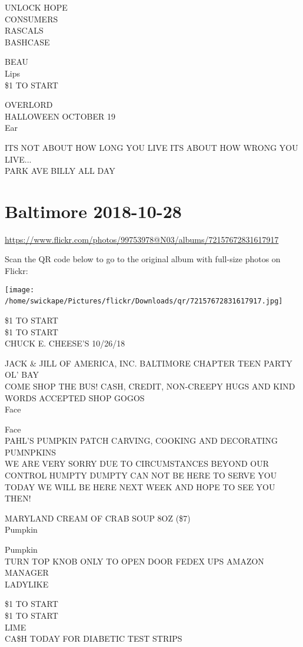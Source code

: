 \documentclass[10pt,letterpaper]{article}
\begin{document}
UNLOCK HOPE\\
CONSUMERS\\
RASCALS\\
BASHCASE

BEAU\\
Lips\\
\$1 TO START

OVERLORD\\
HALLOWEEN OCTOBER 19\\
Ear

ITS NOT ABOUT HOW LONG YOU LIVE ITS ABOUT HOW WRONG YOU LIVE...\\
PARK AVE BILLY ALL DAY
\

\section*{Baltimore 2018-10-28}

\url{https://www.flickr.com/photos/99753978@N03/albums/72157672831617917}

Scan the QR code below to go to the original album with full-size photos on Flickr:

\texttt{[image: /home/swickape/Pictures/flickr/Downloads/qr/72157672831617917.jpg]}
\

\$1 TO START\\
\$1 TO START\\
CHUCK E. CHEESE'S 10/26/18

JACK \& JILL OF AMERICA, INC. BALTIMORE CHAPTER TEEN PARTY\\
OL' BAY\\
COME SHOP THE BUS!  CASH, CREDIT, NON{-}CREEPY HUGS AND KIND WORDS ACCEPTED SHOP GOGOS\\
Face

Face\\
PAHL'S PUMPKIN PATCH CARVING, COOKING AND DECORATING PUMNPKINS\\
WE ARE VERY SORRY DUE TO CIRCUMSTANCES BEYOND OUR CONTROL HUMPTY DUMPTY CAN NOT BE HERE TO SERVE YOU TODAY WE WILL BE HERE NEXT WEEK AND HOPE TO SEE YOU THEN!

MARYLAND CREAM OF CRAB SOUP 8OZ (\$7)\\
Pumpkin

Pumpkin\\
TURN TOP KNOB ONLY TO OPEN DOOR FEDEX UPS AMAZON MANAGER\\
LADYLIKE

\$1 TO START\\
\$1 TO START\\
LIME\\
CA\$H TODAY FOR DIABETIC TEST STRIPS
\end{document}

